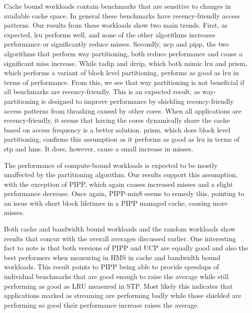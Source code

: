 Cache bound workloads contain benchmarks that are sensitive to changes in available cache space.
In general these benchmarks have recency-friendly access patterns.
Our results from these workloads show two main trends.
First, as expected, \gls{lru} performs well, and none of the other algorithms increases performance or significantly reduce misses.
Secondly, \gls{ucp} and \gls{pipp}, the two algorithms that perform way partitioning, both reduce performance and cause a significant miss increase. 
While \gls{tadip} and \gls{drrip}, which both mimic \gls{lru} and \gls{prism}, which performs a variant of block level partitioning, performs as good as \gls{lru} in terms of performance.
From this, we see that way partitioning is not beneficial if all benchmarks are recency-friendly.
This is an expected result, as way-partitioning is designed to improve performance by shielding recency-friendly access patterns from thrashing caused by other cores.
When all applications are recency-friendly, it seems that having the cores dynamically share the cache based on access frequency is a better solution.
\gls{prism}, which does block level partitioning, confirms this assumption as it performs as good as \gls{lru} in terms of \gls{stp} and \gls{hms}.
It does, however, cause a small increase in misses.

The performance of compute-bound workloads is expected to be mostly unaffected by the partitioning algorithm. 
Our results support this assumption, with the exception of PIPP, which again causes increased misses and a slight performance decrease.
Once again, PIPP-min8 seems to remedy this, pointing to an issue with short block lifetimes in a PIPP managed cache, causing more misses.

Both cache and bandwidth bound workloads and the random workloads show results that concur with the overall averages discussed earlier.
One interesting fact to note is that both versions of PIPP and UCP are equally good and also the best performers when measuring in HMS in cache and bandwidth bound workloads.
This result points to PIPP being able to provide speedups of individual benchmarks that are good enough to raise the average while still performing as good as LRU measured in STP.
Most likely this indicates that applications marked as streaming are performing badly while those shielded are performing so good their performance increase raises the average.


